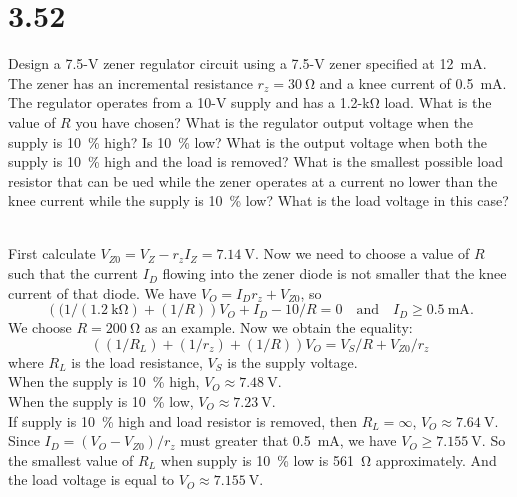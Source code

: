 \documentclass[12pt, a4paper]{article}
\theoremstyle{mystyle}	%
\newcommand{\Ans}{\noindent{\bf Ans:}}
\begin{document}
\section{3.52}
Design a 7.5-\si{\V} zener regulator circuit using a 7.5-\si{\V}
zener specified at \SI{12}{\mA}. The zener has an incremental
resistance $r_z = \SI{30}{\ohm}$ and a knee current of \SI{0.5}{\mA}.
The regulator operates from a 10-\si{\V} supply and has a
1.2-\si{\kohm} load. What is the value of $R$ you have chosen?
What is the regulator output voltage when the supply is \SI{10}{\percent}
high? Is \SI{10}{\percent} low? What is the output voltage when both the
supply is \SI{10}{\percent} high and the load is removed? What is
the smallest possible load resistor that can be ued while the zener
operates at a current no lower than the knee current while the supply
is \SI{10}{\percent} low? What is the load voltage in this case?

\Ans \\
First calculate $V_{Z0} = V_Z - r_z I_Z = \SI{7.14}{\V}$. Now we need to
choose a value of $R$ such that the current $I_D$ flowing into the zener diode
is not smaller that the knee current of that diode. We have
$V_O = I_Dr_z + V_{Z0}$, so
\[
  \left((1/(\SI{1.2}{\kohm}) + (1/R)\right) V_O + I_D - 10/R = 0
    \quad \text{and} \quad I_D \ge \SI{0.5}{\mA}.
\]
We choose $R = \SI{200}{\ohm}$ as an example.
Now we obtain the equality:
\[ \left((1/R_L) + (1/r_z) + (1/R)\right)V_O = V_S/R + V_{Z0}/r_z \]
where $R_L$ is the load resistance, $V_S$ is the supply voltage. \\
When the supply is \SI{10}{\percent} high, $V_O \approx \SI{7.48}{\V}$. \\
When the supply is \SI{10}{\percent} low, $V_O \approx \SI{7.23}{\V}$. \\
If supply is \SI{10}{\percent} high and load resistor is removed,
then $R_L = \infty$, $V_O \approx \SI{7.64}{\V}$.
Since $I_D = (V_O - V_{Z0})/r_z$ must greater that \SI{0.5}{\mA}, we have
$V_O \ge \SI{7.155}{\V}$. So the smallest value of $R_L$ when supply is
\SI{10}{\percent} low is \SI{561}{\ohm} approximately. And the load voltage
is equal to $V_O \approx \SI{7.155}{\V}$.

\end{document}
